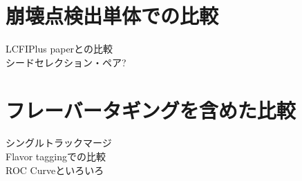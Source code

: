 \section{崩壊点検出単体での比較} \label{Com:ComparisonwithVF}

LCFIPlus paperとの比較\\
シードセレクション・ペア?\\

\section{フレーバータギングを含めた比較} \label{Com:FlavorTaggingComparison}

シングルトラックマージ\\
Flavor taggingでの比較\\
ROC Curveといろいろ\\

